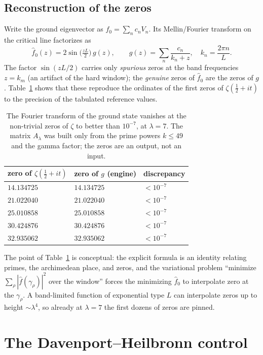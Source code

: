 \documentclass[11pt]{amsart}
\theoremstyle{definition}
\theoremstyle{remark}
\newcommand{\lam}{\lambda}
\begin{document}
\subsection{Reconstruction of the zeros}
Write the ground eigenvector as $f_0=\sum_n c_n V_n$. Its Mellin/Fourier transform on the critical line factorizes as
\[
\widehat f_0(z)=2\sin\!\Big(\tfrac{zL}{2}\Big)\,g(z),\qquad g(z)=\sum_n \frac{c_n}{k_n+z},\quad k_n=\frac{2\pi n}{L}.
\]
The factor $\sin(zL/2)$ carries only \emph{spurious} zeros at the band frequencies $z=k_m$ (an artifact of the hard window); the \emph{genuine} zeros of $\widehat f_0$ are the zeros of $g$. Table~\ref{tab:zeros} shows that these reproduce the ordinates of the first zeros of $\zeta(\tfrac12+it)$ to the precision of the tabulated reference values.

\begin{table}[h]
\centering
\begin{tabular}{lll}
\toprule
zero of $\zeta(\tfrac12+it)$ & zero of $g$ (engine) & discrepancy \\
\midrule
$14.134725$ & $14.134725$ & $<10^{-7}$\\
$21.022040$ & $21.022040$ & $<10^{-7}$\\
$25.010858$ & $25.010858$ & $<10^{-7}$\\
$30.424876$ & $30.424876$ & $<10^{-7}$\\
$32.935062$ & $32.935062$ & $<10^{-7}$\\
\bottomrule
\end{tabular}
\caption{The Fourier transform of the ground state vanishes at the non-trivial zeros of $\zeta$ to better than $10^{-7}$, at $\lam=7$. The matrix $A_\lam$ was built only from the prime powers $k\le 49$ and the gamma factor; the zeros are an output, not an input.}\label{tab:zeros}
\end{table}

The point of Table~\ref{tab:zeros} is conceptual: the explicit formula is an identity relating primes, the archimedean place, and zeros, and the variational problem ``minimize $\sum_\rho|\widehat f(\gamma_\rho)|^2$ over the window'' forces the minimizing $\widehat f_0$ to interpolate zero at the $\gamma_\rho$. A band-limited function of exponential type $L$ can interpolate zeros up to height $\sim\lam^4$, so already at $\lam=7$ the first dozens of zeros are pinned.

\section{The Davenport--Heilbronn control}\label{sec:DH}
\end{document}
